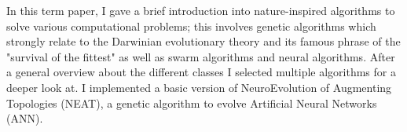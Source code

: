 % 
% 
%
In this term paper, I gave a brief introduction into nature-inspired algorithms
to solve various computational problems; this involves genetic algorithms which
strongly relate to the Darwinian evolutionary theory and its famous phrase of
the "survival of the fittest" as well as swarm algorithms and neural algorithms.
After a general overview about the different classes I selected multiple algorithms
for a deeper look at. I implemented a basic version of NeuroEvolution of Augmenting
Topologies (NEAT), a genetic algorithm to evolve Artificial Neural Networks (ANN).
